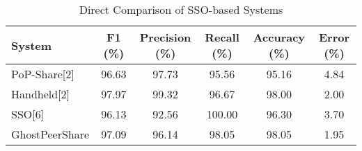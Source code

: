\begin{table}[b!]
\centering
\begin{tabular}{lccccc}
\hline
\textbf{System} & \textbf{F1 (\%)} & \textbf{Precision (\%)} & \textbf{Recall (\%)} & \textbf{Accuracy (\%)} & \textbf{Error (\%)} \\
\hline
PoP-Share[2]   & 96.63 & 97.73 & 95.56 & 95.16 & 4.84 \\
Handheld[2]    & 97.97 & 99.32 & 96.67 & 98.00 & 2.00 \\
SSO[6]         & 96.13 & 92.56 & 100.00 & 96.30 & 3.70 \\
GhostPeerShare & 97.09 & 96.14 & 98.05 & 98.05 & 1.95 \\
\hline
\end{tabular}
\caption{Direct Comparison of SSO-based Systems}
\label{table:ann_system_compare}
\end{table}
